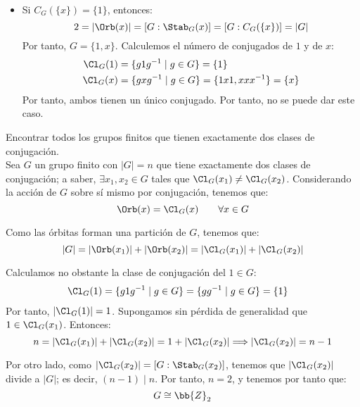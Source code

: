 \begin{ejercicio}
\begin{itemize}
        \item Si $C_G(\{x\}) = \{1\}$, entonces:
        \begin{equation*}
            2 = |\Orb(x)| = [G:\Stab_G(x)] = [G:C_G(\{x\})] = |G|
        \end{equation*}
        Por tanto, $G=\{1,x\}$. Calculemos el número de conjugados de $1$ y de $x$:
        \begin{align*}
            \Cl_G(1) &= \{g1g^{-1} \mid g \in G\} = \{1\} \\
            \Cl_G(x) &= \{gxg^{-1} \mid g \in G\} = \{1x1, xxx^{-1}\} = \{x\}
        \end{align*}
        Por tanto, ambos tienen un único conjugado. Por tanto, no se puede dar este caso.
    \end{itemize}
\end{ejercicio}

\begin{ejercicio}\label{ej:6.5}
    Encontrar todos los grupos finitos que tienen exactamente dos clases de conjugación.\\

    Sea $G$ un grupo finito con $|G| = n$ que tiene exactamente dos clases de conjugación; a saber, $\exists x_1, x_2 \in G$ tales que $\Cl_G(x_1) \neq \Cl_G(x_2)$. Considerando la acción de $G$ sobre sí mismo por conjugación, tenemos que:
    \begin{equation*}
        \Orb(x) = \Cl_G(x) \qquad \forall x \in G
    \end{equation*}

    Como las órbitas forman una partición de $G$, tenemos que:
    \begin{equation*}
        |G| = |\Orb(x_1)| + |\Orb(x_2)| = |\Cl_G(x_1)| + |\Cl_G(x_2)|
    \end{equation*}

    Calculamos no obstante la clase de conjugación del $1\in G$:
    \begin{align*}
        \Cl_G(1) &= \{g1g^{-1} \mid g \in G\} = \{g g^{-1} \mid g \in G\} = \{1\}
    \end{align*}
    Por tanto, $|\Cl_G(1)| = 1$. Supongamos sin pérdida de generalidad que $1\in \Cl_G(x_1)$. Entonces:
    \begin{equation*}
        n = |\Cl_G(x_1)| + |\Cl_G(x_2)| = 1 + |\Cl_G(x_2)|
        \Longrightarrow |\Cl_G(x_2)| = n - 1
    \end{equation*}

    Por otro lado, como $|\Cl_G(x_2)| = [G:\Stab_G(x_2)]$, tenemos que $|\Cl_G(x_2)|$ divide a $|G|$; es decir, $(n-1) \mid n$. Por tanto, $n=2$, y tenemos por tanto que:
    \begin{equation*}
        G\cong \bb{Z}_2
    \end{equation*}
\end{ejercicio}


